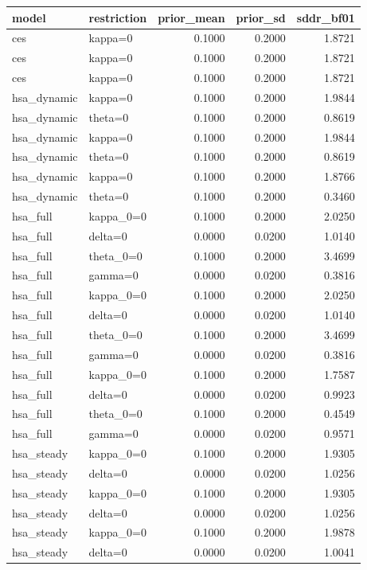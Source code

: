 \begin{tabular}{llrrr}
\toprule
model & restriction & prior\_mean & prior\_sd & sddr\_bf01 \\
\midrule
ces & kappa=0 & 0.1000 & 0.2000 & 1.8721 \\
ces & kappa=0 & 0.1000 & 0.2000 & 1.8721 \\
ces & kappa=0 & 0.1000 & 0.2000 & 1.8721 \\
hsa\_dynamic & kappa=0 & 0.1000 & 0.2000 & 1.9844 \\
hsa\_dynamic & theta=0 & 0.1000 & 0.2000 & 0.8619 \\
hsa\_dynamic & kappa=0 & 0.1000 & 0.2000 & 1.9844 \\
hsa\_dynamic & theta=0 & 0.1000 & 0.2000 & 0.8619 \\
hsa\_dynamic & kappa=0 & 0.1000 & 0.2000 & 1.8766 \\
hsa\_dynamic & theta=0 & 0.1000 & 0.2000 & 0.3460 \\
hsa\_full & kappa\_0=0 & 0.1000 & 0.2000 & 2.0250 \\
hsa\_full & delta=0 & 0.0000 & 0.0200 & 1.0140 \\
hsa\_full & theta\_0=0 & 0.1000 & 0.2000 & 3.4699 \\
hsa\_full & gamma=0 & 0.0000 & 0.0200 & 0.3816 \\
hsa\_full & kappa\_0=0 & 0.1000 & 0.2000 & 2.0250 \\
hsa\_full & delta=0 & 0.0000 & 0.0200 & 1.0140 \\
hsa\_full & theta\_0=0 & 0.1000 & 0.2000 & 3.4699 \\
hsa\_full & gamma=0 & 0.0000 & 0.0200 & 0.3816 \\
hsa\_full & kappa\_0=0 & 0.1000 & 0.2000 & 1.7587 \\
hsa\_full & delta=0 & 0.0000 & 0.0200 & 0.9923 \\
hsa\_full & theta\_0=0 & 0.1000 & 0.2000 & 0.4549 \\
hsa\_full & gamma=0 & 0.0000 & 0.0200 & 0.9571 \\
hsa\_steady & kappa\_0=0 & 0.1000 & 0.2000 & 1.9305 \\
hsa\_steady & delta=0 & 0.0000 & 0.0200 & 1.0256 \\
hsa\_steady & kappa\_0=0 & 0.1000 & 0.2000 & 1.9305 \\
hsa\_steady & delta=0 & 0.0000 & 0.0200 & 1.0256 \\
hsa\_steady & kappa\_0=0 & 0.1000 & 0.2000 & 1.9878 \\
hsa\_steady & delta=0 & 0.0000 & 0.0200 & 1.0041 \\
\bottomrule
\end{tabular}
